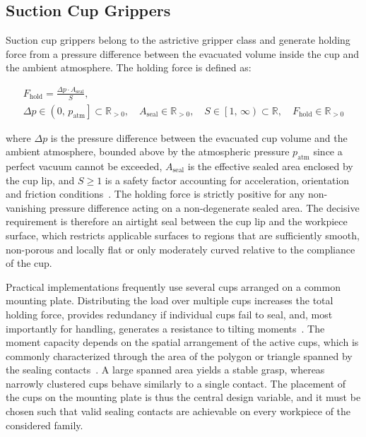 \subsection{Suction Cup Grippers}
\label{subsubsec:suction_cup_grippers}

Suction cup grippers belong to the astrictive gripper class and generate holding force from a pressure difference between the evacuated volume inside
the cup and the ambient atmosphere. The holding force is defined as:

\begin{equation}
    \begin{gathered}
        F_{\mathrm{hold}} = \frac{\Delta p \cdot A_{\mathrm{seal}}}{S}, \\[4pt]
        \Delta p \in \left(0,\, p_{\mathrm{atm}}\right] \subset \mathbb{R}_{>0},\quad
        A_{\mathrm{seal}} \in \mathbb{R}_{>0},\quad
        S \in \left[1,\, \infty\right) \subset \mathbb{R},\quad
        F_{\mathrm{hold}} \in \mathbb{R}_{>0}
    \end{gathered}
\end{equation}

where $\Delta p$ is the pressure difference between the evacuated cup volume and the ambient atmosphere, bounded above by the atmospheric pressure
$p_{\mathrm{atm}}$ since a perfect vacuum cannot be exceeded, $A_{\mathrm{seal}}$ is the effective sealed area enclosed by the cup lip, and $S \geq 1$
is a safety factor accounting for acceleration, orientation and friction conditions~\cite{Zhou2021Bio-Inspired,Gabriel2020Modeling}. The holding force
is strictly positive for any non-vanishing pressure difference acting on a non-degenerate sealed area. The decisive requirement is therefore an
airtight seal between the cup lip and the workpiece surface, which restricts applicable surfaces to regions that are sufficiently smooth, non-porous
and locally flat or only moderately curved relative to the compliance of the cup.

Practical implementations frequently use several cups arranged on a common mounting plate. Distributing the load over multiple cups increases the
total holding force, provides redundancy if individual cups fail to seal, and, most importantly for handling, generates a resistance to tilting
moments~\cite{Mantriota_2007}. The moment capacity depends on the spatial arrangement of the active cups, which
is commonly characterized through the area of the polygon or triangle spanned by the sealing contacts~\cite{Gabriel2020Modeling}. A large spanned area
yields a stable grasp, whereas narrowly clustered cups behave similarly to a single contact. The placement of the cups on the mounting plate is thus
the central design variable, and it must be chosen such that valid sealing contacts are achievable on every workpiece of the considered family.\cite{Roa_Suarez_2015}


